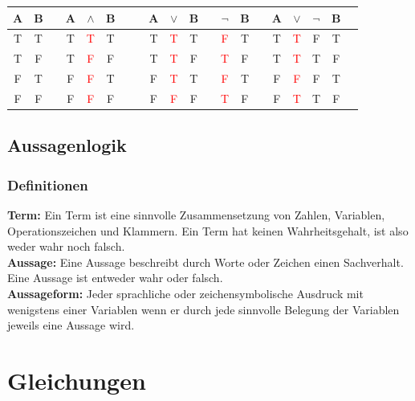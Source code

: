 \begin{multicols}{2}
    \begin{tabular}{@{ }c@{ }@{ }c | c@{ }@{ }c@{ }@{ }c@{ }@{ }c@{ }@{ }c | c@{ }@{ }c@{ }@{ }c@{ }@{ }c@{ }@{ }c | c@{ }@{ }c | c@{ }@{ }c@{ }@{ }c@{ }@{ }c@{ }@{ }c@{ }@{ }c}
        A & B &  & A & $\land$            & B &  &  & A & $\lor$             & B &  & $\lnot$            & B &  & A & $\lor$             & $\lnot$ & B & \\
        \hline
        T & T &  & T & \textcolor{red}{T} & T &  &  & T & \textcolor{red}{T} & T &  & \textcolor{red}{F} & T &  & T & \textcolor{red}{T} & F       & T & \\
        T & F &  & T & \textcolor{red}{F} & F &  &  & T & \textcolor{red}{T} & F &  & \textcolor{red}{T} & F &  & T & \textcolor{red}{T} & T       & F & \\
        F & T &  & F & \textcolor{red}{F} & T &  &  & F & \textcolor{red}{T} & T &  & \textcolor{red}{F} & T &  & F & \textcolor{red}{F} & F       & T & \\
        F & F &  & F & \textcolor{red}{F} & F &  &  & F & \textcolor{red}{F} & F &  & \textcolor{red}{T} & F &  & F & \textcolor{red}{T} & T       & F & \\
    \end{tabular}


    \subsection{Aussagenlogik}
    \vspace{-4mm}
    \subsubsection{Definitionen}
    \vspace{-4mm}
    \textbf{Term:}  Ein Term ist eine sinnvolle Zusammensetzung von Zahlen,
    Variablen, Operationszeichen und Klammern.
    Ein Term hat keinen Wahrheitsgehalt, ist also weder wahr noch falsch. \\
    \textbf{Aussage:}
    Eine Aussage beschreibt durch Worte oder Zeichen einen Sachverhalt.
    Eine Aussage ist entweder wahr oder falsch. \\
    \textbf{Aussageform:}
    Jeder sprachliche oder zeichensymbolische Ausdruck mit wenigstens einer Variablen
    wenn er durch jede sinnvolle Belegung der Variablen jeweils eine Aussage wird.

    \newpage

    \section{Gleichungen}
    \vspace{-4mm}

\end{multicols}
